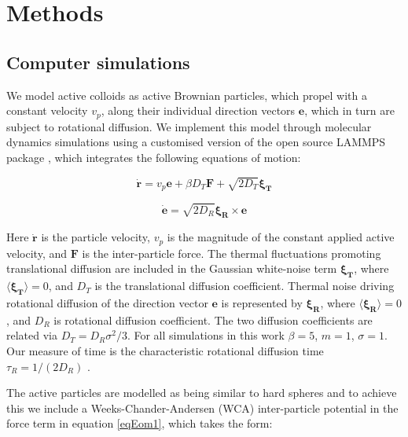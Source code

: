 \section{Methods}
\label{sectionMethods}



\subsection{Computer simulations}
\label{sectionComputerSimulations}


We model active colloids as active Brownian particles, which propel with a constant velocity $v_p$, along their individual direction vectors $\boldsymbol{e}$, which in turn are subject to rotational diffusion. 
We implement this model through molecular dynamics simulations using a customised version of the open source LAMMPS package \cite{plimpton1995}, which integrates the following
equations of motion:


\begin{equation}
    \dot{\mathbf{r}}=v_p\mathbf{e}+\beta D_{T}\mathbf{F} +\sqrt{2D_{T}}\boldsymbol{\xi_T}
    \label{eqEom1}
\end{equation}


\begin{equation}
    \dot{\mathbf{e}}=\sqrt{2D_{R}}\boldsymbol{\xi_R} \times \mathbf{e}
    \label{eqEom2}
\end{equation}


\noindent
Here $\dot{\mathbf{r}}$ is the particle velocity, $v_p$ is the magnitude of the constant applied active velocity, and $\boldsymbol{F}$ is the inter-particle force. The thermal fluctuations promoting translational diffusion are included in the Gaussian white-noise term
$\boldsymbol{\xi_T}$, where $\langle\boldsymbol{\xi_T}\rangle=0$, and $D_{T}$ is the translational diffusion coefficient. Thermal noise driving rotational diffusion of the direction vector $\boldsymbol{e}$ is represented by $\boldsymbol{\xi_R}$,  where $\langle\boldsymbol{\xi_R}\rangle=0$, and $D_{R}$ is rotational diffusion coefficient. The two diffusion coefficients are related via $D_{T} = D_{R}\sigma^{2}/3$. For all simulations in this work $\beta = 5$, $m=1$, $\sigma=1$. Our measure of time is the characteristic rotational diffusion time $\tau_R = 1 / (2D_R)$ \cite{wysocki2014}. 


The active particles are modelled as being similar to hard spheres and to achieve this we include a Weeks-Chander-Andersen (WCA) inter-particle potential in the force term in equation \eqref{eqEom1}, which takes the form:


